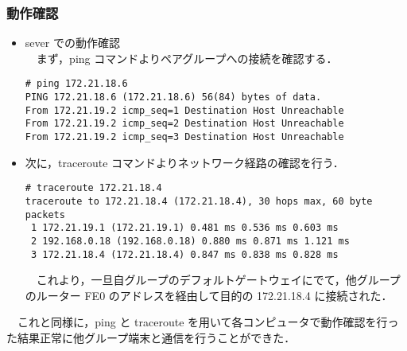 \documentclass[a4j,titlepage]{jarticle}
\begin{document}
\subsubsection{動作確認}
\begin{itemize}
\item sever での動作確認\\ 
  　まず，ping コマンドよりペアグループへの接続を確認する．

\begin{center}
  \begin{screen}
\begin{verbatim}
# ping 172.21.18.6
PING 172.21.18.6 (172.21.18.6) 56(84) bytes of data.
From 172.21.19.2 icmp_seq=1 Destination Host Unreachable
From 172.21.19.2 icmp_seq=2 Destination Host Unreachable
From 172.21.19.2 icmp_seq=3 Destination Host Unreachable
\end{verbatim}
  \end{screen}
\end{center}

\item 次に，traceroute コマンドよりネットワーク経路の確認を行う．

\begin{center}
  \begin{screen}
\begin{verbatim}
# traceroute 172.21.18.4
traceroute to 172.21.18.4 (172.21.18.4), 30 hops max, 60 byte packets
 1 172.21.19.1 (172.21.19.1) 0.481 ms 0.536 ms 0.603 ms
 2 192.168.0.18 (192.168.0.18) 0.880 ms 0.871 ms 1.121 ms
 3 172.21.18.4 (172.21.18.4) 0.847 ms 0.838 ms 0.828 ms 
\end{verbatim}
  \end{screen}
\end{center}

　これより，一旦自グループのデフォルトゲートウェイにでて，他グループのルーター FE0 のアドレスを経由して目的の 172.21.18.4 に接続された．\\
\end{itemize}

　これと同様に，ping と traceroute を用いて各コンピュータで動作確認を行った結果正常に他グループ端末と通信を行うことができた．
\end{document}
